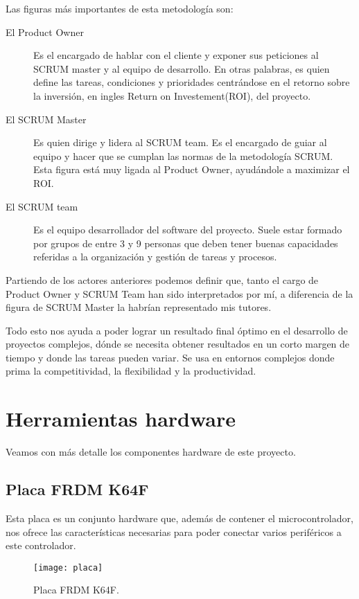 Las figuras más importantes de esta metodología son:
\begin{description}
\item[El Product Owner] Es el encargado de hablar con el cliente y exponer sus peticiones al SCRUM master y al equipo de desarrollo. En otras palabras, es quien define las tareas, condiciones y prioridades centrándose en el retorno sobre la inversión, en ingles Return on Investement(ROI), del proyecto.
\item[El SCRUM Master] Es quien dirige y lidera al SCRUM team. Es el encargado de guiar al equipo y hacer que se cumplan las normas de la metodología SCRUM. Esta figura está muy ligada al Product Owner, ayudándole a maximizar el ROI.
\item[El SCRUM team] Es el equipo desarrollador del software del proyecto. Suele estar formado por grupos de entre 3 y 9 personas que deben tener buenas capacidades referidas a la organización y gestión de tareas y procesos.
\end{description}

Partiendo de los actores anteriores podemos definir que, tanto el cargo de Product Owner y SCRUM Team han sido interpretados por mí, a diferencia de la figura de SCRUM Master la habrían representado mis tutores.

Todo esto nos ayuda a poder lograr un resultado final óptimo en el desarrollo de proyectos complejos, dónde se necesita obtener resultados en un corto margen de tiempo y donde las tareas pueden variar. Se usa en entornos complejos donde prima la competitividad, la flexibilidad y la productividad.


\section{Herramientas hardware}\label{sec:HHardware}

Veamos con más detalle los componentes hardware de este proyecto.

\subsection{Placa FRDM K64F}
Esta placa es un conjunto hardware que, además de contener el microcontrolador, nos ofrece las características necesarias para poder conectar varios periféricos a este controlador.

\begin{figure}[!h]
	\centering
	\texttt{[image: placa]}
	\caption{Placa FRDM K64F.}
\end{figure}
\FloatBarrier

